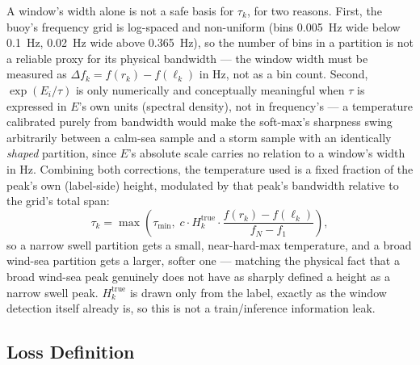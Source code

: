 \documentclass[11pt,a4paper]{article}
\begin{document}
A window's width alone is not a safe basis for $\tau_k$, for two reasons.
First, the buoy's frequency grid is log-spaced and non-uniform (bins
0.005~Hz wide below 0.1~Hz, 0.02~Hz wide above 0.365~Hz), so the number of
bins in a partition is not a reliable proxy for its physical bandwidth — the
window width must be measured as $\Delta f_k = f(r_k)-f(\ell_k)$ in Hz, not
as a bin count. Second, $\exp(E_i/\tau)$ is only numerically and
conceptually meaningful when $\tau$ is expressed in $E$'s own units
(spectral density), not in frequency's — a temperature calibrated purely
from bandwidth would make the soft-max's sharpness swing arbitrarily between
a calm-sea sample and a storm sample with an identically \emph{shaped}
partition, since $E$'s absolute scale carries no relation to a window's
width in Hz. Combining both corrections, the temperature used is a fixed
fraction of the peak's own (label-side) height, modulated by that peak's
bandwidth relative to the grid's total span:
\begin{equation}
\tau_k = \max\!\left(\tau_{\min},\; c \cdot H_k^{\text{true}} \cdot
\frac{f(r_k)-f(\ell_k)}{f_N-f_1}\right),
\end{equation}
so a narrow swell partition gets a small, near-hard-max temperature, and a
broad wind-sea partition gets a larger, softer one — matching the physical
fact that a broad wind-sea peak genuinely does not have as sharply defined a
height as a narrow swell peak. $H_k^{\text{true}}$ is drawn only from the
label, exactly as the window detection itself already is, so this is not a
train/inference information leak.

\subsection{Loss Definition}
\end{document}
